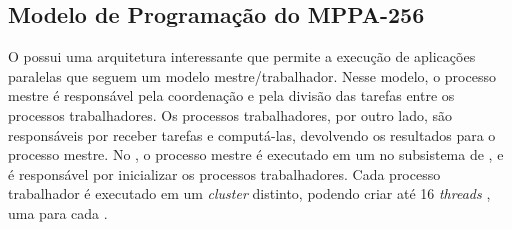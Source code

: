 
\subsection{Modelo de Programação do MPPA-256}
\label{sec:prog-mppa}
%
%
%

O \mppa possui uma arquitetura interessante que permite a execução de aplicações paralelas
que seguem um modelo mestre/trabalhador. Nesse modelo, o processo mestre é responsável
pela coordenação e pela divisão das tarefas entre os processos
trabalhadores. Os processos trabalhadores,
por outro lado, são responsáveis por receber tarefas e computá-las, devolvendo os resultados para o processo
mestre. No \mppa, o processo mestre é executado em um \rman no subsistema de
\es, e é responsável por inicializar os processos trabalhadores. Cada processo trabalhador
é executado em um \textit{cluster} distinto, podendo criar até 16 \textit{threads} \posix, uma para cada \pe.

